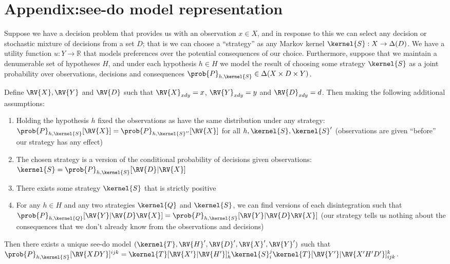 

\section{Appendix:see-do model representation}\label{sec:see-do-rep}


\begin{theorem}\label{th:see_do_rep}
Suppose we have a decision problem that provides us with an observation $x\in X$, and in response to this we can select any decision or stochastic mixture of decisions from a set $D$; that is we can choose a ``strategy'' as any Markov kernel $\kernel{S}:X\to \Delta(D)$. We have a utility function $u:Y\to \mathbb{R}$ that models preferences over the potential consequences of our choice. Furthermore, suppose that we maintain a denumerable set of hypotheses $H$, and under each hypothesis $h\in H$ we model the result of choosing some strategy $\kernel{S}$ as a joint probability over observations, decisions and consequences $\prob{P}_{h,\kernel{S}}\in \Delta(X\times D\times Y)$.

Define $\RV{X},\RV{Y}$ and $\RV{D}$ such that $\RV{X}_{xdy} = x$, $\RV{Y}_{xdy}=y$ and $\RV{D}_{xdy} = d$. Then making the following additional assumptions:
\begin{enumerate}
    \item Holding the hypothesis $h$ fixed the observations as have the same distribution under any strategy: $\prob{P}_{h,\kernel{S}}[\RV{X}]=\prob{P}_{h,\kernel{S}''}[\RV{X}]$ for all $h,\kernel{S},\kernel{S}'$ (observations are given ``before'' our strategy has any effect)
    \item The chosen strategy is a version of the conditional probability of decisions given observations: $\kernel{S}=\prob{P}_{h,\kernel{S}}[\RV{D}|\RV{X}]$
    \item There exists some strategy $\kernel{S}$ that is strictly positive
    \item For any $h\in H$ and any two strategies $\kernel{Q}$ and $\kernel{S}$, we can find versions of each disintegration such that $\prob{P}_{h,\kernel{Q}}[\RV{Y}|\RV{D}\RV{X}]=\prob{P}_{h,\kernel{S}}[\RV{Y}|\RV{D}\RV{X}]$ (our strategy tells us nothing about the consequences that we don't already know from the observations and decisions)
\end{enumerate}

Then there exists a unique see-do model $(\kernel{T},\RV{H}',\RV{D}',\RV{X}',\RV{Y}')$ such that $\prob{P}_{h,\kernel{S}}[\RV{XDY}]^{ijk} = \kernel{T}[\RV{X'}|\RV{H'}]_{h}^{i} \kernel{S}_i^j  \kernel{T}[\RV{Y'}|\RV{X'H'D'}]_{ijk}^k$.
\end{theorem}

